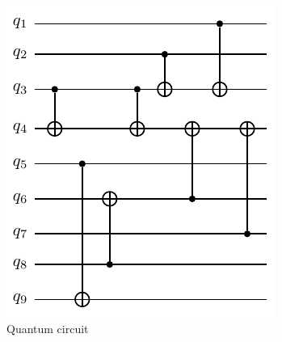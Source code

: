 \begin{figure}
    \centering
    \hfill
    \begin{subfigure}[b]{0.30\linewidth}
        \includegraphics[width=\textwidth]{figures/qroute/orig_circ.pdf}
        \caption{Quantum circuit\label{fig:orig_circ}}
    \end{subfigure}
    \hfill
    \begin{subfigure}[b]{0.30\linewidth}

\end{subfigure}
\end{figure}
